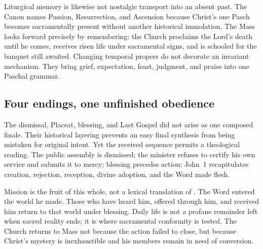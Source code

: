 Liturgical memory is likewise not nostalgic transport into an absent past. The Canon names Passion, Resurrection, and Ascension because Christ's one Pasch becomes sacramentally present without another historical immolation. The Mass looks forward precisely by remembering: the Church proclaims the Lord's death until he comes, receives risen life under sacramental signs, and is schooled for the banquet still awaited. Changing temporal propers do not decorate an invariant mechanism. They bring grief, expectation, feast, judgment, and praise into one Paschal grammar.

\subsection{Four endings, one unfinished obedience}

The dismissal, Placeat, blessing, and Last Gospel did not arise as one composed finale. Their historical layering prevents an easy final synthesis from being mistaken for original intent. Yet the received sequence permits a theological reading. The public assembly is dismissed; the minister refuses to certify his own service and submits it to mercy; blessing precedes action; John~1 recapitulates creation, rejection, reception, divine adoption, and the Word made flesh.

Mission is the fruit of this whole, not a lexical translation of . The Word entered the world he made. Those who have heard him, offered through him, and received him return to that world under blessing. Daily life is not a profane remainder left when sacred reality ends; it is where sacramental conformity is tested. The Church returns to Mass not because the action failed to close, but because Christ's mystery is inexhaustible and his members remain in need of conversion.
